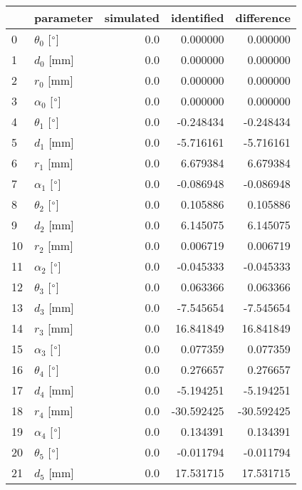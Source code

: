\documentclass{standalone}%
\begin{document}
%
\normalsize%
\begin{tabular}{llrrr}
\toprule
{} &                 parameter & simulated & identified & difference \\
\midrule
0  &  $\theta_{0}$ [$\degree$] &       0.0 &   0.000000 &   0.000000 \\
1  &              $d_{0}$ [mm] &       0.0 &   0.000000 &   0.000000 \\
2  &              $r_{0}$ [mm] &       0.0 &   0.000000 &   0.000000 \\
3  &  $\alpha_{0}$ [$\degree$] &       0.0 &   0.000000 &   0.000000 \\
4  &  $\theta_{1}$ [$\degree$] &       0.0 &  -0.248434 &  -0.248434 \\
5  &              $d_{1}$ [mm] &       0.0 &  -5.716161 &  -5.716161 \\
6  &              $r_{1}$ [mm] &       0.0 &   6.679384 &   6.679384 \\
7  &  $\alpha_{1}$ [$\degree$] &       0.0 &  -0.086948 &  -0.086948 \\
8  &  $\theta_{2}$ [$\degree$] &       0.0 &   0.105886 &   0.105886 \\
9  &              $d_{2}$ [mm] &       0.0 &   6.145075 &   6.145075 \\
10 &              $r_{2}$ [mm] &       0.0 &   0.006719 &   0.006719 \\
11 &  $\alpha_{2}$ [$\degree$] &       0.0 &  -0.045333 &  -0.045333 \\
12 &  $\theta_{3}$ [$\degree$] &       0.0 &   0.063366 &   0.063366 \\
13 &              $d_{3}$ [mm] &       0.0 &  -7.545654 &  -7.545654 \\
14 &              $r_{3}$ [mm] &       0.0 &  16.841849 &  16.841849 \\
15 &  $\alpha_{3}$ [$\degree$] &       0.0 &   0.077359 &   0.077359 \\
16 &  $\theta_{4}$ [$\degree$] &       0.0 &   0.276657 &   0.276657 \\
17 &              $d_{4}$ [mm] &       0.0 &  -5.194251 &  -5.194251 \\
18 &              $r_{4}$ [mm] &       0.0 & -30.592425 & -30.592425 \\
19 &  $\alpha_{4}$ [$\degree$] &       0.0 &   0.134391 &   0.134391 \\
20 &  $\theta_{5}$ [$\degree$] &       0.0 &  -0.011794 &  -0.011794 \\
21 &              $d_{5}$ [mm] &       0.0 &  17.531715 &  17.531715 \\

\end{tabular}
\end{document}
